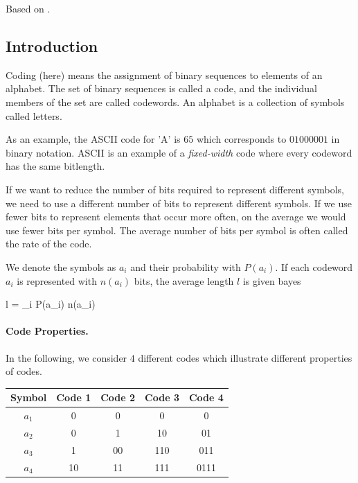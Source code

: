 
Based on \cite {Sayood2018}.


\subsection{Introduction}

Coding (here) means the assignment of binary sequences to elements of an alphabet. The set of binary sequences is called a code, and the individual members of the set are called codewords. An alphabet is a collection of symbols called letters.

As an example, the ASCII code for 'A' is $65$ which corresponds to $01000001$ in binary notation. ASCII is an example of a \emph{fixed-width} code where every codeword has the same bitlength.

If we want to reduce the number of bits required to represent different symbols, we need to use a different number of bits to represent different symbols. If we use fewer bits to represent elements that occur more often, on the average we would use fewer bits per symbol. The average number of bits per symbol is often called the rate of the code.

We denote the symbols as $a_i$ and their probability with $P(a_i)$. If each codeword $a_i$ is represented with $n(a_i)$ bits, the average length $l$ is given bayes

\bee
l = \sum_i P(a_i) n(a_i)
\eee

\paragraph{Code Properties.} In the following, we consider $4$ different codes which illustrate different properties of codes.

\vspace{3mm}

\begin{tabular}{c|cccc}
    \label{2021-04-14_tab1}
    Symbol & Code 1 & Code 2 & Code 3 & Code 4 \\ \hline
    $a_1$ & 0 & 0 & 0 & 0  \\
    $a_2$ & 0 & 1 & 10 & 01  \\
    $a_3$ & 1 & 00 & 110 & 011  \\
    $a_4$ & 10 & 11 & 111 & 0111
\end{tabular}

\vspace{3mm}

